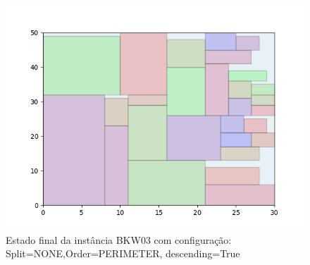 \begin{figure}[H]
    \centering
    \caption[]{Estado final da instância BKW03 com configuração: Split=NONE,Order=PERIMETER, descending=True}
    \label{fig:bkw03-none-perimeter-true}
    \includegraphics[scale=0.5]{output/figures/bkw/bkw03/none/perimeter/true/00}
\end{figure}